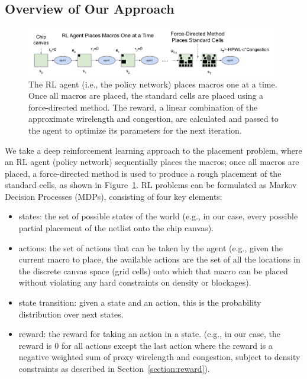 \documentclass{article}
\begin{document}
\subsection{Overview of Our Approach}
\label{section:overview}
\begin{figure}
    \centering
    \includegraphics[width=0.98\textwidth]{actions-states-cropped.pdf}
    \caption{The RL agent (i.e., the policy network) places macros one at a time. Once all macros are placed, the standard cells are placed using a force-directed method. The reward, a linear combination of the approximate wirelength and congestion, are calculated and passed to the agent to optimize its parameters for the next iteration.}
    \label{fig:placement-actions}
\end{figure}
We take a deep reinforcement learning approach to the placement problem, where an RL agent (policy network) sequentially places the macros; once all macros are placed, a force-directed method is used to produce a rough placement of the standard cells, as shown in Figure~\ref{fig:placement-actions}. RL problems can be formulated as Markov Decision Processes (MDPs), consisting of four key elements:
\begin{itemize}
  \item states: the set of possible states of the world (e.g., in our case, every possible partial placement of the netlist onto the chip canvas).
  \item actions: the set of actions that can be taken by the agent (e.g., given the current macro to place, the available actions are the set of all the locations in the discrete canvas space (grid cells) onto which that macro can be placed without violating any hard constraints on density or blockages).
  \item state transition: given a state and an action, this is the probability distribution over next states.
  \item reward: the reward for taking an action in a state. (e.g., in our case, the reward is 0 for all actions except the last action where the reward is a negative weighted sum of proxy wirelength and congestion, subject to density constraints as described in Section~\ref{section:reward}).
\end{itemize}
\end{document}
